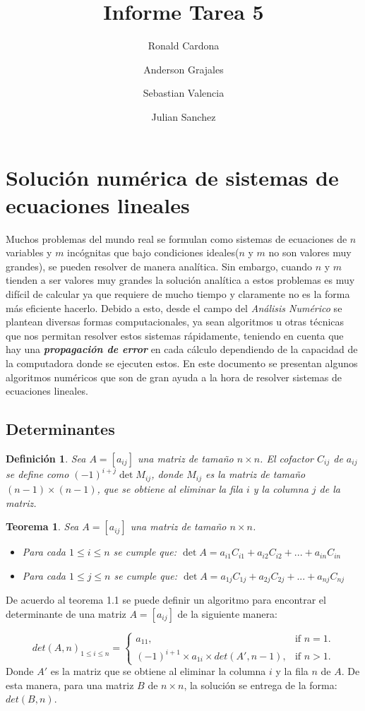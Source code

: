\documentclass[12pt]{article}
\title{Informe Tarea 5}
\author {Ronald Cardona
\and Anderson Grajales
\and Sebastian Valencia
\and Julian Sanchez}
\newtheorem{definition}{Definición}[section]
\newtheorem{theorem}{Teorema}[section]
\begin{document}
	\maketitle
	\section{Solución numérica de sistemas de ecuaciones lineales}
	Muchos problemas del mundo real se formulan como sistemas de ecuaciones de $n$ variables y $m$ incógnitas que bajo condiciones ideales($n$ y $m$ no son valores muy grandes), se pueden resolver de manera analítica. Sin embargo, cuando $n$ y $m$ tienden a ser valores muy grandes la solución analítica a estos problemas es muy difícil de calcular ya que requiere de mucho tiempo y claramente no es la forma más eficiente hacerlo. Debido a esto, desde el campo del \textit{Análisis Numérico} se plantean diversas formas computacionales, ya sean algoritmos u otras técnicas que nos permitan resolver estos sistemas rápidamente, teniendo en cuenta que hay una \textit{\textbf{propagación de error}} en cada cálculo dependiendo de la capacidad de la computadora donde se ejecuten estos.
	En este documento se presentan algunos algoritmos numéricos que son de gran ayuda a la hora de resolver sistemas de ecuaciones lineales.
	\subsection{Determinantes}
	\begin{definition}
		Sea $A = [a_{ij}]$ una matriz de tamaño $n \times n$. El cofactor $C_{ij}$ de $a_{ij}$ se define como $(-1)^{i+j}\det {M_{ij}}$, donde $M_{ij}$ es la matriz de tamaño $(n - 1) \times (n - 1)$, que se obtiene al eliminar la fila $i$ y la columna $j$ de la matriz.
	\end{definition}
	\begin{theorem}
		Sea $A=[a_{ij}]$ una matriz de tamaño $n \times n$.
		\begin{itemize}
			\item Para cada $1\leq i \leq n$ se cumple que:
			$\det {A} = a_{i1}C_{i1} + a_{i2}C_{i2} + ... + a_{in}C_{in}$
			\item Para cada $1\leq j \leq n$ se cumple que:
			$\det {A} = a_{1j}C_{1j} + a_{2j}C_{2j} + ... + a_{nj}C_{nj}$
		\end{itemize}
	\end{theorem}
	De acuerdo al teorema 1.1 se puede definir un algoritmo para encontrar el determinante de una matriz $A = [a_{ij}]$ de la siguiente manera:
	
	\begin{equation}
	det(A, n)_{1\leq i \leq n}=\begin{cases}
	a_{11}, & \text{if $n = 1$}.\\
	(-1)^{i+1} \times a_{1i} \times det(A', n - 1) , & \text{if $n > 1$}.
	\end{cases}
	\end{equation}
	Donde $A'$ es la matriz que se obtiene al eliminar la columna $i$ y la fila $n$ de $A$. De esta manera, para una matriz $B$ de $n \times n$, la solución se entrega de la forma:
	$det(B, n)$.
\end{document}
